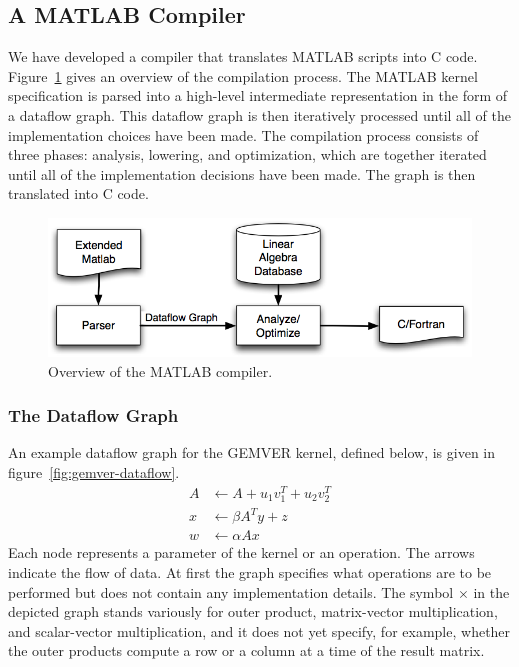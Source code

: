 \documentclass[11pt]{article}
\begin{document}
\subsection{A MATLAB Compiler}
\label{sec:matlab}

We have developed a compiler that translates MATLAB scripts into C code.    Figure~\ref{fig:compiler} gives an overview of the compilation process. The MATLAB kernel specification is parsed into a high-level intermediate representation in the form of a dataflow graph.  This dataflow graph is then iteratively processed until all of the implementation choices have been made.  The compilation process consists of three phases: analysis, lowering, and optimization, which are together iterated until all of the implementation decisions have been made.  The graph is then translated into C code.

\begin{figure}[htbp]
\centering
\includegraphics[width=.7\textwidth]{figures/compile.png}

\caption{Overview of the MATLAB compiler.}
\label{fig:compiler}
\end{figure}

\subsubsection{The Dataflow Graph}

An example dataflow graph for the GEMVER kernel, defined below, is given in figure~\ref{fig:gemver-dataflow}.
\begin{align*}
  A &\gets A + u_1 v_1^T + u_2 v_2^T \\[-0.5ex]
  x &\gets \beta A^T y + z \\[-0.5ex]
  w &\gets \alpha A x
\end{align*}
Each node represents a parameter of the kernel or an operation.  The arrows indicate the flow of data. At first the graph specifies what operations are to be performed but does not contain any implementation details. The symbol $\times$ in the depicted graph stands variously for outer product, matrix-vector multiplication, and scalar-vector multiplication, and it does not yet specify, for example, whether the outer products compute a row or a column at a time of the result matrix.
\end{document}
